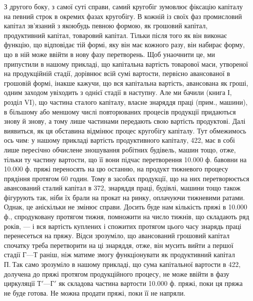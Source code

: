 З другого боку, з самої суті справи, самий кругобіг зумовлює фіксацію
капіталу на певний строк в окремих фазах кругобігу. В кожній із
своїх фаз промисловий капітал зв’язаний з якоюбудь певною формою,
як грошовий капітал, продуктивний капітал, товаровий капітал. Тільки
після того як він виконає функцію, що відповідає тій формі, яку він
має кожного разу, він набирає форму, що в ній може ввійти в нову
фазу перетворень. Щоб унаочнити це, ми припустили в нашому прикладі,
що капітальна вартість товарової маси, утвореної на продукційній стадії,
дорівнює всій сумі вартости, первісно авансованої в грошовій формі,
інакше кажучи, що вся капітальна вартість, авансована як гроші, одним
заходом увіходить з однієї стадії в наступну. Але ми бачили (книга І,
розділ VI), що частина сталого капіталу, власне знаряддя праці (прим.,
машини), в більшому або меншому числі повторюваних процесів продукції
придаються знову й знову, а тому лише частинами передають свою вартість
продуктові. Далі виявиться, як ця обставина відмінює процес кругобігу
капіталу. Тут обмежимось ось чим: у нашому прикладі вартість
продуктивного капіталу, 422, має в собі лише пересічно обчислене
зношування робітних будівель, машин тощо, отже, тільки ту частину
вартости, що її вони підчас перетворення \num{10.000} ф. бавовни на \num{10.000} ф.
пряжі переносять на цю останню, на продукт тижневого процесу прядіння
протягом 60 годин. Тому в засобах продукції, що на них перетворюється
авансований сталий капітал в 372, знаряддя праці, будівлі,
машини тощо також фігурують так, ніби їх брали на прокат на ринку,
оплачуючи тижневими ратами. Однак, це аніскільки не змінює справи.
Досить буде нам кількість пряжі в \num{10.000} ф., спродуковану протягом
тижня, помножити на число тижнів, що складають ряд років, — і вся
вартість куплених і спожитих протягом цього часу знарядь праці перенесеться
на пряжу. Відси зрозуміло, що авансований грошовий капітал
спочатку треба перетворити на ці знаряддя, отже, він мусить вийти а
першої стадії $Г — Т$ раніш, ніж матиме змогу функціонувати як продуктивний
капітал $П.~Т$ак само зрозуміло в нашому прикладі, що сума
капітальної вартости в 422, долучена до пряжі протягом продукційного
процесу, не може ввійти в фазу циркуляції $Т' — Г'$ як складова
частина вартости \num{10.000} ф. пряжі, поки ця пряжа не буде готова.
Не можна продати пряжі, поки її не напряли.

